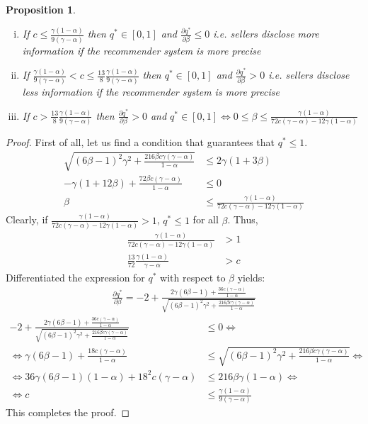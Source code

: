 \documentclass[a4paper]{article}
\newtheorem{proposition}[theorem]{Proposition}
\begin{document}
\begin{proposition}\label{thres_beta}
	\begin{enumerate}[(i)]
		\item If $c \le \frac{\gamma(1-\alpha)}{9(\gamma - \alpha)}$ then $q^* \in [0, 1]$ and $\frac{\partial q^*}{\partial \beta} \le 0$ i.e. sellers disclose more information if the recommender system is more precise
		\item If $\frac{\gamma(1-\alpha)}{9(\gamma - \alpha)} < c \le \frac{13}{8}\frac{\gamma(1-\alpha)}{9(\gamma - \alpha)}$ then $q^* \in [0, 1]$ and $\frac{\partial q^*}{\partial \beta} > 0$ i.e. sellers disclose less information if the recommender system is more precise
		\item If $c > \frac{13}{8}\frac{\gamma(1-\alpha)}{9(\gamma - \alpha)}$ then $\frac{\partial q^*}{\partial \beta} > 0$ and $q^* \in [0, 1] \iff 0 \le \beta \le \frac{\gamma(1-\alpha)}{72 c (\gamma - \alpha) - 12 \gamma (1-\alpha)}$ 
	\end{enumerate}
\end{proposition}
\begin{proof}
	First of all, let us find a condition that guarantees that $q^* \le 1$. 
	\begin{align*}
	\sqrt{(6 \beta - 1)^2 \gamma^2 + \frac{216 \beta c \gamma (\gamma - \alpha)}{1-\alpha}} &\le 2\gamma (1+3 \beta)\\
	-\gamma(1+12 \beta) + \frac{72 \beta c (\gamma - \alpha)}{1 - \alpha} &\le 0\\
	\beta &\le \frac{\gamma(1-\alpha)}{72c (\gamma - \alpha) - 12 \gamma (1-\alpha)}
	\end{align*}
	Clearly, if $\frac{\gamma(1-\alpha)}{72c (\gamma - \alpha) - 12 \gamma (1-\alpha)} > 1$, $q^* \le 1$ for all $\beta$. Thus, 
	\begin{align*}
	\frac{\gamma(1-\alpha)}{72c (\gamma - \alpha) - 12 \gamma (1-\alpha)} &> 1\\
	\frac{13}{72} \frac{\gamma(1-\alpha)}{\gamma - \alpha} &> c
	\end{align*}
	Differentiated the expression for $q^*$ with respect to $\beta$ yields:
	\begin{align*}
	\frac{\partial q^*}{\partial \beta} = -2 + \frac{2 \gamma (6 \beta - 1) + \frac{36 c (\gamma - \alpha)}{1-\alpha}}{ \sqrt{(6 \beta - 1)^2\gamma^2 + \frac{216 \beta c \gamma (\gamma - \alpha)}{1-\alpha}}}
	\end{align*} 
	\begin{align*}
	-2 + \frac{2 \gamma (6 \beta - 1) + \frac{36 c (\gamma - \alpha)}{1-\alpha}}{ \sqrt{(6 \beta - 1)^2\gamma^2 + \frac{216 \beta c \gamma (\gamma - \alpha)}{1-\alpha}}} &\le 0 \iff\\
	\iff \gamma(6 \beta - 1) + \frac{18c(\gamma - \alpha)}{1- \alpha} &\le \sqrt{(6 \beta - 1)^2\gamma^2 + \frac{216 \beta c \gamma (\gamma - \alpha)}{1-\alpha}} \iff\\
	\iff 36 \gamma (6 \beta - 1)(1-\alpha) + 18^2 c(\gamma - \alpha) &\le 216 \beta \gamma (1-\alpha) \iff\\
	\iff c &\le \frac{\gamma(1 - \alpha)}{9(\gamma - \alpha)}  
	\end{align*} 
	This completes the proof.
\end{proof}
\end{document}
